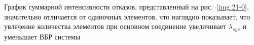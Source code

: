 \Conclusion
График суммарной интенсивности отказов, представленный на рис.~\ref{img:21-0}, значительно отличается от одиночных элементов, что наглядно показывает, что увлечение количества элементов при основном соединение увеличивает $\lambda_{sys}$ и уменьшает ВБР системы